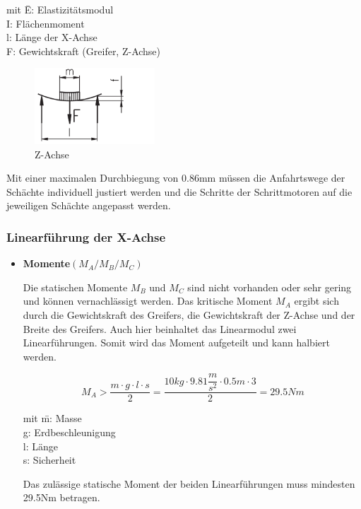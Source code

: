 \begin{itemize}
\begin{tabbing}
mit \=E: Elastizitätsmodul\\
		\>I: Flächenmoment\\
		\>l: Länge der X-Achse\\
		\>F: Gewichtskraft (Greifer, Z-Achse)\\
\end{tabbing}



\begin{figure}[htbp] 
  \centering
     \includegraphics[width=0.4\textwidth]{Bilder/Durchbiegung.png}
			\caption{Z-Achse}
  \label{fig:Bild1}
\end{figure}
	
Mit einer maximalen Durchbiegung von 0.86mm müssen die Anfahrtswege der Schächte individuell justiert werden und die Schritte der Schrittmotoren auf die jeweiligen Schächte angepasst werden. 









\end{itemize}

\subsubsection{Linearführung der X-Achse}


\begin{itemize}
\item \textbf{Momente$(M_A/M_B/M_C)$}

Die statischen Momente $M_B$ und $M_C$ sind nicht vorhanden oder sehr gering und können vernachlässigt werden. Das kritische Moment $M_A$ ergibt sich durch die Gewichtskraft des Greifers, die Gewichtskraft der Z-Achse und der Breite  des Greifers. Auch hier beinhaltet das Linearmodul zwei Linearführungen. Somit wird das Moment aufgeteilt und kann halbiert werden.


\[M_A>\dfrac{m\cdot g \cdot l \cdot s}{2}=\dfrac{10kg\cdot 9.81\dfrac{m}{s^2}\cdot 0.5m\cdot 3}{2}=29.5Nm\]

\begin{tabbing}
mit \=m: Masse\\
		\>g: Erdbeschleunigung\\
		\>l: Länge\\
		\>s: Sicherheit\\
\end{tabbing}

Das zulässige statische Moment der beiden Linearführungen muss mindesten 29.5Nm betragen.


\end {itemize}



